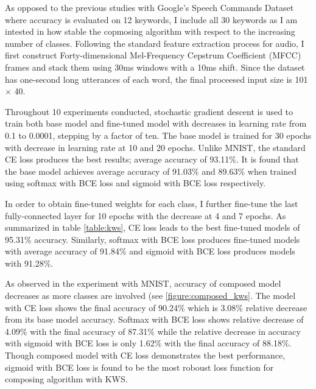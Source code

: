 \documentclass{article}
\begin{document}
As opposed to the previous studies with Google’s Speech Commands Dataset where accuracy is evaluated on 12 keywords, I include all 30 keywords as I am intested in how stable the copmosing algorithm with respect to the increasing number of classes. Following the standard feature extraction process for audio, I first construct Forty-dimensional Mel-Frequency Cepstrum Coefficient (MFCC) frames and stack them using 30ms windows with a 10ms shift. Since the dataset has one-second long utterances of each word, the final proceesed input size is 101 × 40.

Throughout 10 experiments conducted, stochastic gradient descent is used to train both base model and fine-tuned model with decreases in learning rate from 0.1 to 0.0001, stepping by a factor of ten. The base model is trained for 30 epochs with decrease in learning rate at 10 and 20 epochs. Unlike MNIST, the standard CE loss produces the best results; average accuracy of 93.11\%. It is found that the base model achieves average accuracy of 91.03\% and 89.63\% when trained using softmax with BCE loss and sigmoid with BCE loss respectively.

In order to obtain fine-tuned weights for each class, I further fine-tune the last fully-connected layer for 10 epochs with the decrease at 4 and 7 epochs. As summarized in table \ref{table:kws}, CE loss leads to the best fine-tuned models of 95.31\% accuracy. Similarly, softmax with BCE loss produces fine-tuned models with average accuracy of 91.84\% and sigmoid with BCE loss produces models with 91.28\%.

As observed in the experiment with MNIST, accuracy of composed model decreases as more classes are involved (see \ref{figure:composed_kws}. The model with CE loss shows the final accuracy of 90.24\% which is 3.08\% relative decrease from its base model accuracy. Softmax with BCE loss shows relative decrease of 4.09\% with the final accuracy of 87.31\% while the relative decrease in accuracy with sigmoid with BCE loss is only 1.62\% with the final accuracy of 88.18\%. Though composed model with CE loss demonstrates the best performance, sigmoid with BCE loss is found to be the most roboust loss function for composing algorithm with KWS.
\end{document}
